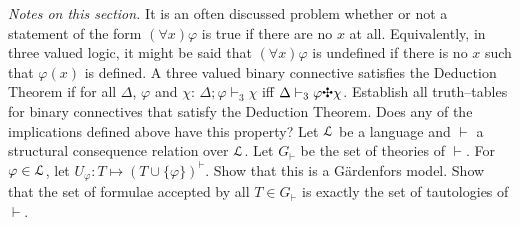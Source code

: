 {\it Notes on this section.} It is an often discussed problem whether
or not a statement of the form $(\forall x)\varphi$ is true if there
are no $x$ at all. Equivalently, in three valued logic, it might be
said that $(\forall x)\varphi$ is undefined if there is no $x$ such
that $\varphi(x)$ is defined.
\vplatz
\exercise
A three valued binary connective  satisfies the
Deduction Theorem if for all $\Delta$, $\varphi$ and
$\chi$: $\Delta; \varphi \vdash_3 \chi$ iff
$\Delta \vdash_3 \varphi \mbox{\ding{67}} \chi$. Establish all 
truth--tables for binary connectives that satisfy the Deduction 
Theorem. Does any of the implications defined above have this 
property?
\vplatz \exercise Let $\mathcal{L}$ be a language and $\vdash$ a
structural consequence relation over $\mathcal{L}$. Let $G_{\vdash}$ be
the set of theories of $\vdash$. For $\varphi \in \mathcal{L}$, let
$U_{\varphi} \colon T \mapsto (T \cup \{\varphi\})^{\vdash}$. Show that
this is a G\"ardenfors model. Show that the set of formulae
accepted by all $T \in G_{\vdash}$ is exactly the set of
tautologies of $\vdash$.
